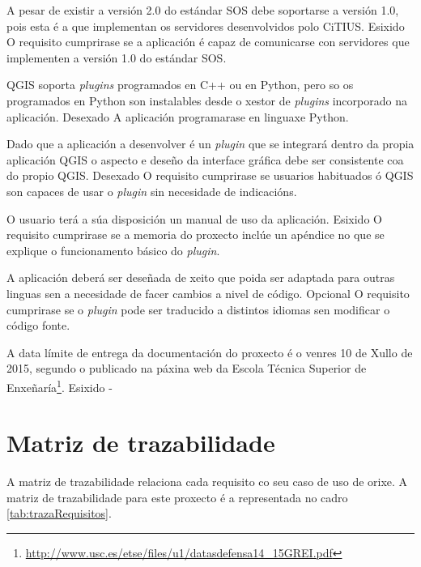 		  	{A pesar de existir a versión 2.0 do estándar SOS debe soportarse a versión 1.0, pois esta é a que implementan os servidores desenvolvidos polo CiTIUS.}%
			{Esixido}%
			{O requisito cumprirase se a aplicación é capaz de comunicarse con servidores que implementen a versión 1.0 do estándar SOS.}%
			
		  	{QGIS soporta \emph{plugins} programados en C++ ou en Python, pero so os programados en Python son instalables desde o xestor de \emph{plugins} incorporado na aplicación.}%
			{Desexado}%
			{A aplicación programarase en linguaxe Python.}%
			
		  	{Dado que a aplicación a desenvolver é un \emph{plugin} que se integrará dentro da propia aplicación QGIS o aspecto e deseño da interface gráfica debe ser consistente coa do propio QGIS.}%
			{Desexado}%
			{O requisito cumprirase se usuarios habituados ó QGIS son capaces de usar o \emph{plugin} sin necesidade de indicacións.}%

		  	{O usuario terá a súa disposición un manual de uso da aplicación.}%
			{Esixido}%
			{O requisito cumprirase se a memoria do proxecto inclúe un apéndice no que se explique o funcionamento básico do \emph{plugin}.}%
			
		  	{A aplicación deberá ser deseñada de xeito que poida ser adaptada para outras linguas sen a necesidade de facer cambios a nivel de código.}%
			{Opcional}%
			{O requisito cumprirase se o \emph{plugin} pode ser traducido a distintos idiomas sen modificar o código fonte.}%
			
		  	{A data límite de entrega da documentación do proxecto é o venres 10 de Xullo de 2015, segundo o publicado na páxina web da Escola Técnica Superior de Enxeñaría\footnote{\url{http://www.usc.es/etse/files/u1/datasdefensa14_15GREI.pdf}}.}%
			{Esixido}%
			{-}%

\section{Matriz de trazabilidade}
A matriz de trazabilidade relaciona cada requisito co seu caso de uso de orixe. A matriz de trazabilidade para este proxecto é a representada no cadro \ref{tab:trazaRequisitos}.

